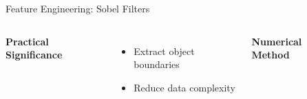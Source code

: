 \documentclass[
11pt,notheorems,hyperref={pdfauthor=whatever}
]{beamer}
\begin{document}
\begin{frame}{Feature Engineering: Sobel Filters}
\begin{columns}[T,onlytextwidth]
\vspace{2em}


    \alert<4>{\textbf{Practical Significance}}
    \begin{itemize}
    \item Extract object boundaries
    \item Reduce data complexity
    \end{itemize}
    
\vspace{1em}

\alert<5>{\textbf{Numerical Method}}
\begin{itemize}
\end{itemize}



\end{columns}

\end{frame}




\end{document}
